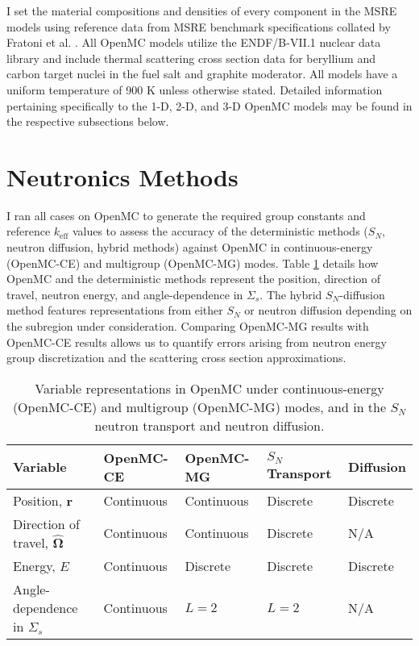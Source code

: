 I set the material compositions and densities of every component in the \gls{MSRE} models using
reference data from \gls{MSRE} benchmark specifications collated by Fratoni et al.
\cite{fratoni_molten_2020}. All OpenMC models utilize the ENDF/B-VII.1 nuclear data library
\cite{chadwick_endf/b-vii.1_2011} and include thermal scattering cross section data for beryllium
and carbon target nuclei in the fuel salt and graphite moderator. All models have a uniform
temperature of 900 K unless otherwise stated. Detailed information pertaining specifically to the
1-D, 2-D, and 3-D OpenMC models may be found in the respective subsections below.

\section{Neutronics Methods} \label{sec:nts-methods}

I ran all cases on OpenMC to generate the required group constants and reference $k_\text{eff}$
values to assess the accuracy of the deterministic methods ($S_N$, neutron diffusion, hybrid 
methods) against OpenMC in continuous-energy (OpenMC-CE) and multigroup (OpenMC-MG) modes. Table
\ref{table:var} details how OpenMC and the deterministic methods represent the position, direction
of travel, neutron energy, and angle-dependence in $\Sigma_s$. The hybrid $S_N$-diffusion method
features representations from either $S_N$ or neutron diffusion depending on the subregion under
consideration. Comparing OpenMC-MG results with OpenMC-CE results allows us
to quantify errors arising from neutron energy group discretization and the scattering cross
section approximations.

\begin{table}[htb!]
  \centering
  \footnotesize
  \caption{Variable representations in OpenMC under continuous-energy (OpenMC-CE) and multigroup
  (OpenMC-MG) modes, and in the $S_N$ neutron transport and neutron diffusion.}
  \begin{tabular}{l l l l l}
    \toprule
    Variable & OpenMC-CE & OpenMC-MG & $S_N$ Transport & Diffusion \\
    \midrule
    Position, $\bm{r}$ & Continuous & Continuous & Discrete & Discrete \\
    Direction of travel, $\bm{\hat{\Omega}}$ & Continuous & Continuous & Discrete & N/A \\
    Energy, $E$ & Continuous & Discrete & Discrete & Discrete \\
    Angle-dependence in $\Sigma_s$ & Continuous & $L=2$ & $L=2$ & N/A \\
    \bottomrule
  \end{tabular}
  \label{table:var}
\end{table}

